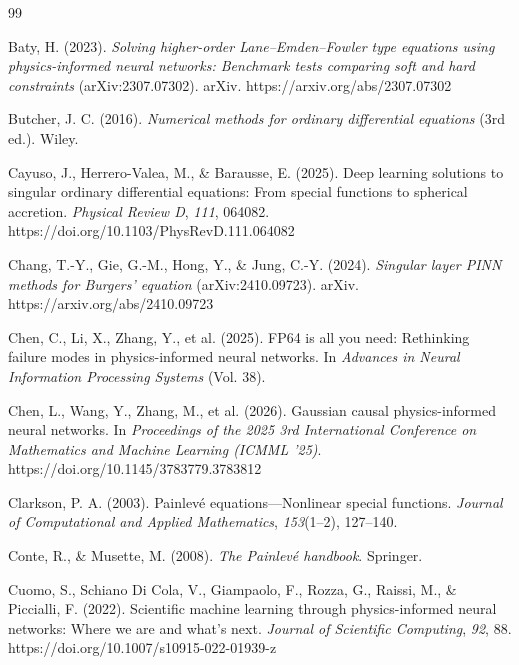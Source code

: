 \documentclass[11pt,a4paper]{article}
\theoremstyle{definition}
\begin{document}
\begin{thebibliography}{99}

Baty, H. (2023). \emph{Solving higher-order {Lane--Emden--Fowler} type equations using physics-informed neural networks: Benchmark tests comparing soft and hard constraints} (arXiv:2307.07302). arXiv. https://arxiv.org/abs/2307.07302

Butcher, J. C. (2016). \emph{Numerical methods for ordinary differential equations} (3rd ed.). Wiley.

Cayuso, J., Herrero-Valea, M., \& Barausse, E. (2025). Deep learning solutions to singular ordinary differential equations: From special functions to spherical accretion. \emph{Physical Review D}, \emph{111}, 064082. https://doi.org/10.1103/PhysRevD.111.064082

Chang, T.-Y., Gie, G.-M., Hong, Y., \& Jung, C.-Y. (2024). \emph{Singular layer {PINN} methods for {Burgers}' equation} (arXiv:2410.09723). arXiv. https://arxiv.org/abs/2410.09723

Chen, C., Li, X., Zhang, Y., et al. (2025). {FP64} is all you need: Rethinking failure modes in physics-informed neural networks. In \emph{Advances in Neural Information Processing Systems} (Vol. 38).

Chen, L., Wang, Y., Zhang, M., et al. (2026). Gaussian causal physics-informed neural networks. In \emph{Proceedings of the 2025 3rd International Conference on Mathematics and Machine Learning (ICMML '25)}. https://doi.org/10.1145/3783779.3783812

Clarkson, P. A. (2003). {Painlev\'e} equations---Nonlinear special functions. \emph{Journal of Computational and Applied Mathematics}, \emph{153}(1--2), 127--140.

Conte, R., \& Musette, M. (2008). \emph{The {Painlev\'e} handbook}. Springer.

Cuomo, S., Schiano Di Cola, V., Giampaolo, F., Rozza, G., Raissi, M., \& Piccialli, F. (2022). Scientific machine learning through physics-informed neural networks: Where we are and what's next. \emph{Journal of Scientific Computing}, \emph{92}, 88. https://doi.org/10.1007/s10915-022-01939-z


\end{thebibliography}
\end{document}
